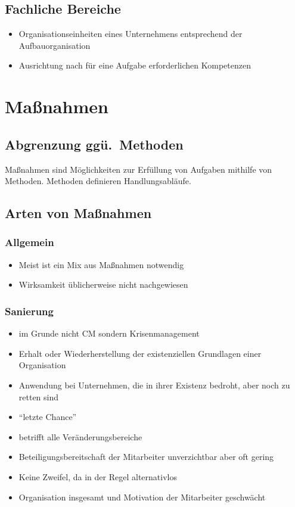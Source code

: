 \documentclass[a4paper, 12pt]{article}
\begin{document}
\subsection{Fachliche Bereiche}
\begin{itemize}
  \item Organisationseinheiten eines Unternehmens entsprechend der Aufbauorganisation
  \item Ausrichtung nach für eine Aufgabe erforderlichen Kompetenzen
\end{itemize}


\section{Maßnahmen}


\subsection{Abgrenzung ggü.\ Methoden}
Maßnahmen sind Möglichkeiten zur Erfüllung von Aufgaben mithilfe von Methoden.
Methoden definieren Handlungsabläufe.


\subsection{Arten von Maßnahmen}

\subsubsection*{Allgemein}
\begin{itemize}
  \item Meist ist ein Mix aus Maßnahmen notwendig
  \item Wirksamkeit üblicherweise nicht nachgewiesen
\end{itemize}

\subsubsection*{Sanierung}
\begin{itemize}
  \item im Grunde nicht CM sondern Krisenmanagement
  \item Erhalt oder Wiederherstellung der existenziellen Grundlagen einer Organisation
  \item Anwendung bei Unternehmen, die in ihrer Existenz bedroht, aber noch zu retten sind
  \item ``letzte Chance''
  \item betrifft alle Veränderungsbereiche
  \item Beteiligungsbereitschaft der Mitarbeiter unverzichtbar aber oft gering
\end{itemize}
\begin{itemize}
  \renewcommand{\labelitemi}{+}%
  \item Keine Zweifel, da in der Regel alternativlos
\end{itemize}
\begin{itemize}
  \renewcommand{\labelitemi}{\(-\)}%
  \item Organisation insgesamt und Motivation der Mitarbeiter geschwächt
\end{itemize}
\end{document}
